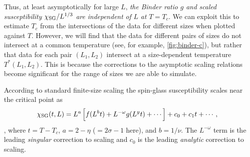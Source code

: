 Thus, at least asymptotically for large $L$, \emph{the Binder ratio $g$ and
  scaled susceptibility $\chi_{\mathrm{SG}}/L^{1/3}$ are independent of $L$ at $T=T_c$}.
We can exploit this to estimate $T_c$ from the intersections of the data for
different sizes when plotted against $T$. However, we will find that the data
for different pairs of sizes do not intersect at a common temperature (see, for
example, \cref{fig:binder-c}), but rather that data for each pair $(L_1,L_2)$
intersect at a size-dependent temperature $T^*(L_1,L_2)$. This is because the
corrections to the asymptotic scaling relations become significant for the
range of sizes we are able to simulate.

According to standard finite-size scaling the spin-glass susceptibility
scales near the critical point as
\begin{equation}
    \chi_{\mathrm{SG}}(t,L)
    = L^a \left[f(L^b t) + L^{-\omega} g(L^y t) + \cdots\right]
      + c_0 + c_1 t + \cdots,
    \label{eq:standard-fss}
\end{equation}
\autocite{privman1983finite},
where $t=T-T_c$, $a=2-\eta$ ($=2\sigma-1$ here), and $b=1/\nu$. The
$L^{-\omega}$ term is the leading \emph{singular} correction to scaling and
$c_0$ is the leading \emph{analytic} correction to scaling.

